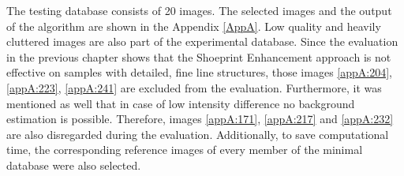\documentclass[draft,final]{vutinfth} %
\begin{document}
The testing database consists of 20 images.
The selected images and the output of the algorithm are shown in the Appendix \ref{AppA}.
Low quality and heavily cluttered images are also part of the experimental database.
Since the evaluation in the previous chapter shows that the Shoeprint Enhancement approach is not effective on samples with detailed, fine line structures, those images \ref{appA:204}, \ref{appA:223}, \ref{appA:241} are excluded from the evaluation.
Furthermore, it was mentioned as well that in case of low intensity difference no background estimation is possible. 
Therefore, images \ref{appA:171}, \ref{appA:217} and \ref{appA:232} are also disregarded during the evaluation.
Additionally, to save computational time, the corresponding reference images of every member of the minimal database were also selected.
\end{document}
